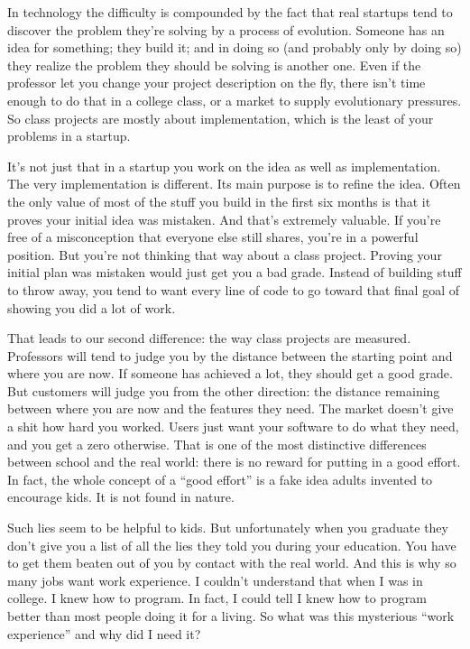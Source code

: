 \documentclass[12pt]{book}
\begin{document}
In technology the difficulty is compounded by the fact that real
startups tend to discover the problem they're solving by a process of
evolution. Someone has an idea for something; they build it; and in
doing so (and probably only by doing so) they realize the problem they
should be solving is another one. Even if the professor let you change
your project description on the fly, there isn't time enough to do that
in a college class, or a market to supply evolutionary pressures. So
class projects are mostly about implementation, which is the least of
your problems in a startup.

It's not just that in a startup you work on the idea as well as
implementation. The very implementation is different. Its main purpose
is to refine the idea. Often the only value of most of the stuff you
build in the first six months is that it proves your initial idea was
mistaken. And that's extremely valuable. If you're free of a
misconception that everyone else still shares, you're in a powerful
position. But you're not thinking that way about a class project.
Proving your initial plan was mistaken would just get you a bad grade.
Instead of building stuff to throw away, you tend to want every line of
code to go toward that final goal of showing you did a lot of work.

That leads to our second difference: the way class projects are
measured. Professors will tend to judge you by the distance between the
starting point and where you are now. If someone has achieved a lot,
they should get a good grade. But customers will judge you from the
other direction: the distance remaining between where you are now and
the features they need. The market doesn't give a shit how hard you
worked. Users just want your software to do what they need, and you get
a zero otherwise. That is one of the most distinctive differences
between school and the real world: there is no reward for putting in a
good effort. In fact, the whole concept of a ``good effort'' is a fake
idea adults invented to encourage kids. It is not found in nature.

Such lies seem to be helpful to kids. But unfortunately when you
graduate they don't give you a list of all the lies they told you during
your education. You have to get them beaten out of you by contact with
the real world. And this is why so many jobs want work experience. I
couldn't understand that when I was in college. I knew how to program.
In fact, I could tell I knew how to program better than most people
doing it for a living. So what was this mysterious ``work experience''
and why did I need it?
\end{document}

